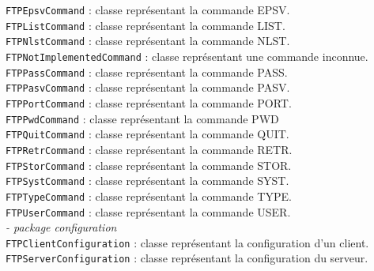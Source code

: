 \begin{tabbing}
			\>\>\verb+FTPEpsvCommand+ : classe représentant la commande EPSV.\\
			\>\>\verb+FTPListCommand+ : classe représentant la commande LIST.\\
			\>\>\verb+FTPNlstCommand+ : classe représentant la commande NLST.\\
			\>\>\verb+FTPNotImplementedCommand+ : classe représentant une commande inconnue.\\
			\>\>\verb+FTPPassCommand+ : classe représentant la commande PASS.\\
			\>\>\verb+FTPPasvCommand+ : classe représentant la commande PASV.\\
			\>\>\verb+FTPPortCommand+ : classe représentant la commande PORT.\\
			\>\>\verb+FTPPwdCommand+ : classe représentant la commande PWD\\
			\>\>\verb+FTPQuitCommand+ : classe représentant la commande QUIT.\\
			\>\>\verb+FTPRetrCommand+ : classe représentant la commande RETR.\\
			\>\>\verb+FTPStorCommand+ : classe représentant la commande STOR.\\
			\>\>\verb+FTPSystCommand+ : classe représentant la commande SYST.\\
			\>\>\verb+FTPTypeCommand+ : classe représentant la commande TYPE.\\
			\>\>\verb+FTPUserCommand+ : classe représentant la commande USER.\\
		\>\textit{- package configuration}\\
			\>\>\verb+FTPClientConfiguration+ : classe représentant la configuration d'un client.\\
			\>\>\verb+FTPServerConfiguration+ : classe représentant la configuration du serveur.\\
\end{tabbing}

